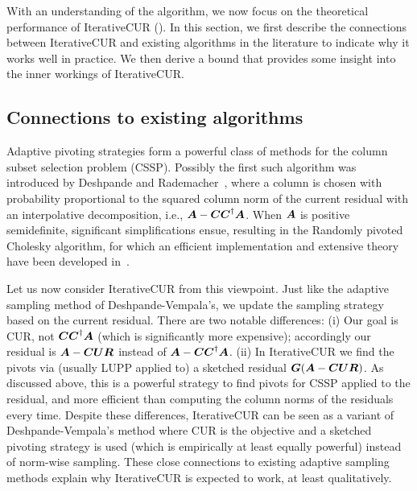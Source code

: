 With an understanding of the algorithm, we now focus on the theoretical performance of IterativeCUR (\icur). 
In this section, 
we first describe the connections between IterativeCUR and existing algorithms in the literature to indicate why it works well in practice.  
We then derive a bound that provides some insight into the inner workings of IterativeCUR. 

\subsection{{Connections to existing algorithms}}\label{subsec:connection}
Adaptive pivoting strategies form a powerful class of methods for the column subset selection problem (CSSP). 
Possibly the first such algorithm was introduced by 
Deshpande and Rademacher~\cite{deshpande2006adaptive}, where a column is chosen with probability proportional to the squared column norm of the current residual with an interpolative decomposition, i.e., $\boldsymbol{A}-\boldsymbol{CC}^\dagger \boldsymbol{A}$. 
When $\boldsymbol{A}$ is positive semidefinite, significant simplifications ensue, resulting in the Randomly pivoted Cholesky algorithm, for which an efficient implementation and extensive theory have been developed in~\cite{chen2025randomly}. 

Let us now consider IterativeCUR from this viewpoint. Just like the adaptive sampling method of Deshpande-Vempala's, we update the sampling strategy based on the current residual. There are two notable differences: (i) Our goal is CUR, not $\boldsymbol{CC}^\dagger \boldsymbol{A}$ (which is significantly more expensive); accordingly our residual is  $\boldsymbol{A}-\boldsymbol{CUR}$ instead of $\boldsymbol{A}-\boldsymbol{C}\boldsymbol{C}^\dagger \boldsymbol{A}$. 
(ii) In IterativeCUR we find the pivots via (usually LUPP applied to) a sketched residual $\boldsymbol{G}(\boldsymbol{A}-\boldsymbol{CUR})$. As discussed above, this is a powerful strategy to find pivots for CSSP applied to the residual, and more efficient than computing the column norms of the residuals every time. 
Despite these differences, IterativeCUR can be seen as a variant of Deshpande-Vempala's method where CUR is the objective and a sketched pivoting strategy is used (which is empirically at least equally powerful) instead of norm-wise sampling. These close connections to existing adaptive sampling methods explain why IterativeCUR is expected to work, at least qualitatively. 


